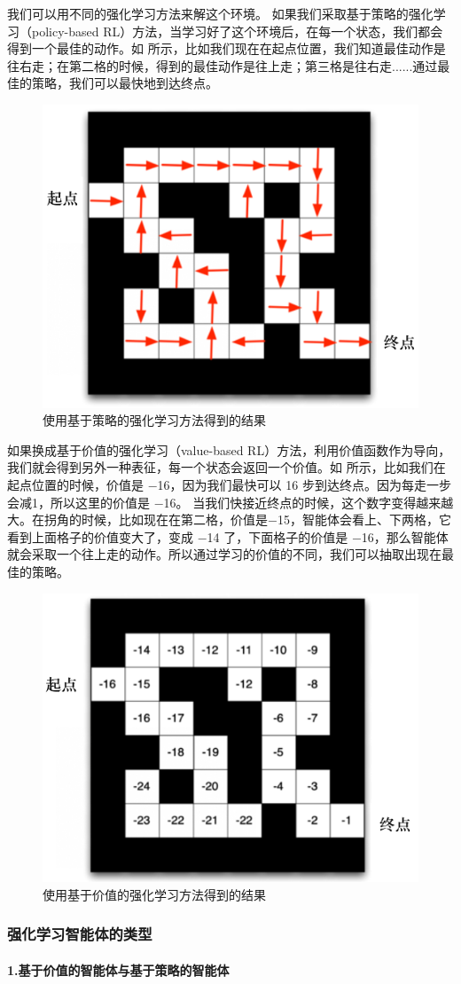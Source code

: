 我们可以用不同的强化学习方法来解这个环境。
如果我们采取基于策略的强化学习（policy-based RL）方法，当学习好了这个环境后，在每一个状态，我们都会得到一个最佳的动作。如 所示，比如我们现在在起点位置，我们知道最佳动作是往右走；在第二格的时候，得到的最佳动作是往上走；第三格是往右走......通过最佳的策略，我们可以最快地到达终点。

\begin{figure}[htb]
    \centering
    \includegraphics[width=0.3\linewidth]{res/ch1/1.31}
    \caption{使用基于策略的强化学习方法得到的结果}
    \label{fig:maze_policy_rl}
\end{figure}

如果换成基于价值的强化学习（value-based RL）方法，利用价值函数作为导向，我们就会得到另外一种表征，每一个状态会返回一个价值。如 所示，比如我们在起点位置的时候，价值是 $-$16，因为我们最快可以 16 步到达终点。因为每走一步会减1，所以这里的价值是 $-$16。
当我们快接近终点的时候，这个数字变得越来越大。在拐角的时候，比如现在在第二格，价值是$-$15，智能体会看上、下两格，它看到上面格子的价值变大了，变成 $-$14 了，下面格子的价值是 $-$16，那么智能体就会采取一个往上走的动作。所以通过学习的价值的不同，我们可以抽取出现在最佳的策略。

\begin{figure}[htb]
    \centering
    \includegraphics[width=0.3\linewidth]{res/ch1/1.32}
    \caption{使用基于价值的强化学习方法得到的结果}
    \label{fig:maze_value_rl}
\end{figure}

\subsubsection{强化学习智能体的类型} 
\paragraph{1.基于价值的智能体与基于策略的智能体}~{}
\newline


